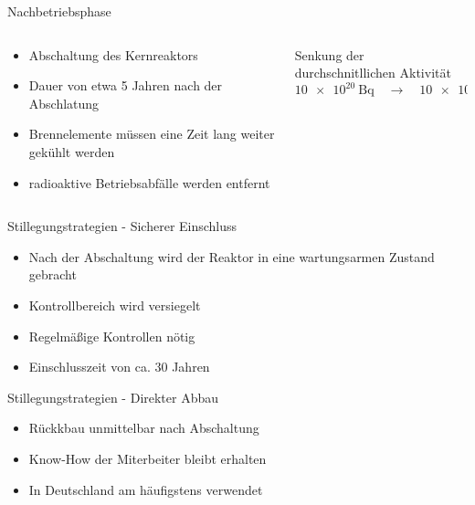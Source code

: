\begin{frame}{ Nachbetriebsphase }
  \begin{columns}

    \begin{column}{0.48\textwidth}

        \begin{itemize}
          \setlength\itemsep{1.2em}
          \item{ Abschaltung des Kernreaktors }
          \item{ Dauer von etwa 5 Jahren nach der Abschlatung}
          \item{ Brennelemente müssen eine Zeit lang weiter gekühlt werden }
          \item{ radioaktive Betriebsabfälle werden entfernt }
        \end{itemize}

    \end{column}

    \begin{column}{0.48\textwidth}
      Senkung der durchschnitllichen Aktivität
      \begin{equation*}
        \SI{10e20}{\becquerel} \quad \rightarrow  \quad \SI{10e16}{\becquerel}
      \end{equation*}
    \end{column}

  \end{columns}
\end{frame}



\begin{frame}{Stillegungstrategien - Sicherer Einschluss}
  \begin{itemize}
    \setlength\itemsep{1.2em}
    \item{ Nach der Abschaltung wird der Reaktor in eine wartungsarmen Zustand gebracht} 
    \item{ Kontrollbereich wird versiegelt}
    \item{ Regelmäßige Kontrollen nötig}
    \item{ Einschlusszeit von ca. $30$ Jahren}
  \end{itemize}
\end{frame}



\begin{frame}{Stillegungstrategien - Direkter Abbau}
   \begin{itemize}
    \setlength\itemsep{1.2em}
      \item{ Rückkbau unmittelbar nach Abschaltung }
      \item{ Know-How der Miterbeiter bleibt erhalten}
      \item{ In Deutschland am häufigstens verwendet}
  \end{itemize}
\end{frame}



